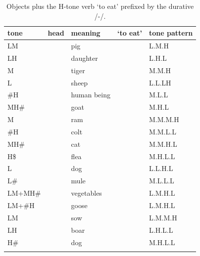 \begin{table}%
\caption{\label{tab:objectsplushtoneverbsprefixedbythedurative}Objects plus the H-tone verb  ‘to eat’ prefixed by the {durative} /-/.}
\begin{tabularx}{\textwidth}{ l l l Q l }
\lsptoprule
	tone & head & meaning &  ‘to eat’ & tone pattern\\ \midrule
	LM &  & pig &  & L.M.H\\
	LH &  & daughter &  & L.H.L\\
	M &  & tiger &  & M.M.H\\
	L &  & sheep & \shadedcell {} & \shadedcell L.L.LH\\
	\#H &  & human being &  & M.L.L\\
	MH\# &  & goat &  & M.H.L\\ \addlinespace \hdashline \addlinespace
	M &  & ram &  & M.M.M.H\\
	\#H &  & colt &  & M.M.L.L\\
	MH\# &  & cat &  & M.M.H.L\\
	H\$ &  & flea &  & M.H.L.L\\
	L &  & dog &  & L.L.H.L\\
	L\# &  & mule &  & M.L.L.L\\
	LM+MH\# &  & vegetables &  & L.M.H.L\\
	LM+\#H &  & goose & \shadedcell {} & \shadedcell L.M.H.L\\
	LM &  & sow &  & L.M.M.H\\
	LH &  & boar &  & L.H.L.L\\
	H\# &  & dog &  & M.H.L.L\\
\lspbottomrule
\end{tabularx}
\end{table}



